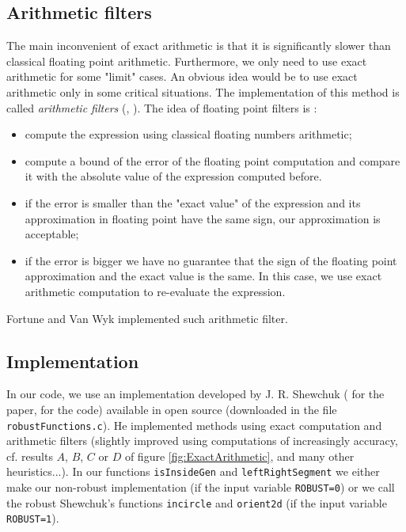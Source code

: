 \subsection{Arithmetic filters}
The main inconvenient of exact arithmetic is that it is significantly slower than classical floating point arithmetic. Furthermore, we only need to use exact arithmetic for some "limit" cases. An obvious idea would be to use exact arithmetic only in some critical situations. The implementation of this method is called \textit{arithmetic filters} (\cite{schirra}, \cite{shewchuk1996robust}). The idea of floating point filters is : 
\begin{itemize}
\item compute the expression using classical floating numbers arithmetic;
\item compute a bound of the error of the floating point computation and compare it with the absolute value of the expression computed before.
\item if the error is smaller than the "exact value" of the expression and its approximation in floating point have the same sign, our approximation is acceptable;
\item if the error is bigger we have no guarantee that the sign of the floating point approximation and the exact value is the same. In this case, we use exact arithmetic computation to re-evaluate the expression.
\end{itemize}

Fortune and Van Wyk implemented such arithmetic filter.

\subsection{Implementation}
In our code, we use an implementation developed by J. R. Shewchuk (\cite{shewchuk1996robust} for the paper, \cite{robust} for the code) available in open source (downloaded in the file \texttt{robustFunctions.c}). He implemented methods using exact computation and arithmetic filters (slightly improved using computations of increasingly accuracy, cf. results $A$, $B$, $C$ or $D$ of figure \ref{fig:ExactArithmetic}, and many other heuristics...). In our functions \texttt{isInsideGen} and \texttt{leftRightSegment} we either make our non-robust implementation (if the input variable \texttt{ROBUST=0}) or we call the robust Shewchuk's functions \texttt{incircle} and \texttt{orient2d} (if the input variable \texttt{ROBUST=1}).








